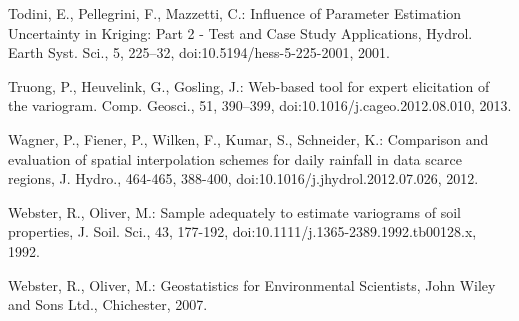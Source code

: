 \begin{thebibliography}
\bibitem{} \hangindent=1cm Todini, E., Pellegrini, F., Mazzetti, C.: Influence of Parameter Estimation Uncertainty in Kriging: Part 2 - Test and Case Study Applications, Hydrol. Earth Syst. Sci., 5, 225–32, doi:10.5194/hess-5-225-2001, 2001.

\bibitem{} \hangindent=1cm Truong, P., Heuvelink, G., Gosling, J.: Web-based tool for expert elicitation of the variogram. Comp. Geosci., 51, 390–399, doi:10.1016/j.cageo.2012.08.010, 2013.

\bibitem{} \hangindent=1cm Wagner, P., Fiener, P., Wilken, F., Kumar, S., Schneider, K.: Comparison and evaluation of spatial interpolation schemes for daily rainfall in data scarce regions, J. Hydro., 464-465, 388-400, doi:10.1016/j.jhydrol.2012.07.026, 2012.

\bibitem{} \hangindent=1cm Webster, R., Oliver, M.: Sample adequately to estimate variograms of soil properties, J. Soil. Sci., 43, 177-192, doi:10.1111/j.1365-2389.1992.tb00128.x, 1992.

\bibitem{} \hangindent=1cm Webster, R., Oliver, M.: Geostatistics for Environmental Scientists, John Wiley and Sons Ltd., Chichester, 2007.

\end{thebibliography}

\endgroup